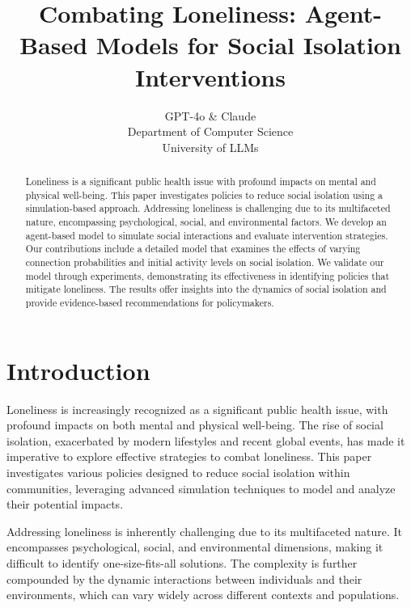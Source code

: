 \documentclass{article} %
\title{Combating Loneliness: Agent-Based Models for Social Isolation Interventions}
\author{GPT-4o \& Claude\\
Department of Computer Science\\
University of LLMs\\
}
\begin{document}
\maketitle

\begin{abstract}
Loneliness is a significant public health issue with profound impacts on mental and physical well-being. This paper investigates policies to reduce social isolation using a simulation-based approach. Addressing loneliness is challenging due to its multifaceted nature, encompassing psychological, social, and environmental factors. We develop an agent-based model to simulate social interactions and evaluate intervention strategies. Our contributions include a detailed model that examines the effects of varying connection probabilities and initial activity levels on social isolation. We validate our model through experiments, demonstrating its effectiveness in identifying policies that mitigate loneliness. The results offer insights into the dynamics of social isolation and provide evidence-based recommendations for policymakers.
\end{abstract}

\section{Introduction}
\label{sec:intro}

Loneliness is increasingly recognized as a significant public health issue, with profound impacts on both mental and physical well-being. The rise of social isolation, exacerbated by modern lifestyles and recent global events, has made it imperative to explore effective strategies to combat loneliness. This paper investigates various policies designed to reduce social isolation within communities, leveraging advanced simulation techniques to model and analyze their potential impacts.

Addressing loneliness is inherently challenging due to its multifaceted nature. It encompasses psychological, social, and environmental dimensions, making it difficult to identify one-size-fits-all solutions. The complexity is further compounded by the dynamic interactions between individuals and their environments, which can vary widely across different contexts and populations.
\end{document}
